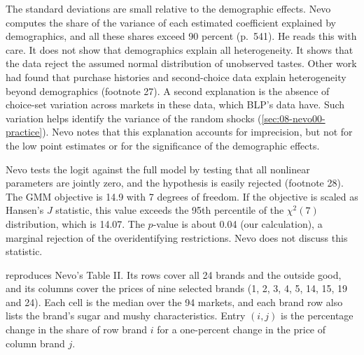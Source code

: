 The standard deviations are small relative to the demographic effects. Nevo computes the share of the
variance of each estimated coefficient explained by demographics, and all these shares exceed 90 percent
(p.~541). He reads this with care. It does not show that demographics explain all heterogeneity. It shows
that the data reject the assumed normal distribution of unobserved tastes. Other work had found that
purchase histories \citep{RossiMcCullochAllenby1996} and second-choice data \citep{BerryLevinsohnPakes2004}
explain heterogeneity beyond demographics (footnote 27). A second explanation is the absence of
choice-set variation across markets in these data, which BLP's data have. Such variation helps identify
the variance of the random shocks (\cref{sec:08-nevo00-practice}). Nevo notes that this explanation
accounts for imprecision, but not for the low point estimates or for the significance of the demographic
effects.

Nevo tests the logit against the full model by testing that all nonlinear parameters are jointly zero,
and the hypothesis is easily rejected (footnote 28). The GMM objective is 14.9 with 7 degrees of freedom.
If the objective is scaled as Hansen's $J$ statistic, this value exceeds the 95th percentile of the
$\chi^2(7)$ distribution, which is 14.07. The $p$-value is about 0.04 (our calculation), a marginal
rejection of the overidentifying restrictions. Nevo does not discuss this statistic.

 reproduces Nevo's Table II. Its rows cover all 24 brands and the outside good,
and its columns cover the prices of nine selected brands (1, 2, 3, 4, 5, 14, 15, 19 and 24). Each cell is
the median over the 94 markets, and each brand row also lists the brand's sugar and mushy characteristics. Entry $(i,j)$ is
the percentage change in the share of row brand $i$ for a one-percent change in the price of column
brand $j$.

